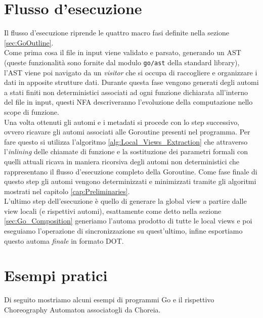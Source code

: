 \section{Flusso d'esecuzione}
Il flusso d'esecuzione riprende le quattro macro fasi definite nella sezione \ref{sec:GoOutline}.\bigskip\\
Come prima cosa il file in input viene validato e parsato, generando un AST (queste funzionalità sono fornite dal modulo \texttt{go/ast} della standard library), l'AST viene poi navigato da un \emph{visitor} che si occupa di raccogliere e organizzare i dati in apposite strutture dati. Durante questa fase vengono generati degli automi a stati finiti non deterministici associati ad ogni funzione dichiarata all'interno del file in input, questi NFA descriveranno l'evoluzione della computazione nello scope di funzione.\bigskip\\
Una volta ottenuti gli automi e i metadati si procede con lo step successivo, ovvero ricavare gli automi associati alle Goroutine presenti nel programma. Per fare questo si utilizza l'algoritmo \ref{alg:Local_Views_Extraction} che attraverso l'\emph{inlining} delle chiamate di funzione e la sostituzione dei parametri formali con quelli attuali ricava in maniera ricorsiva degli automi non deterministici che rappresentano il flusso d'esecuzione completo della Goroutine. Come fase finale di questo step gli automi vengono determinizzati e minimizzati tramite gli algoritmi mostrati nel capitolo \ref{cap:Preliminaries}.\bigskip\\
L'ultimo step dell'esecuzione è quello di generare la global view a partire dalle view locali (e rispettivi automi), esattamente come detto nella sezione \ref{sec:Go_Composition} generiamo l'automa prodotto di tutte le local views e poi eseguiamo l'operazione di sincronizzazione su quest'ultimo, infine esportiamo questo automa \emph{finale} in formato DOT.

\section{Esempi pratici}
Di seguito mostriamo alcuni esempi di programmi Go e il rispettivo Choreography Automaton associatogli da Choreia. %


